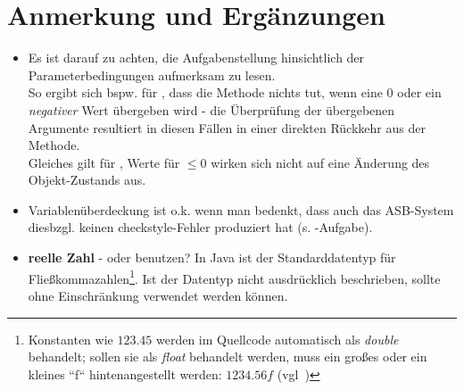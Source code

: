 \section{Anmerkung und Ergänzungen}

\begin{itemize}
    \item Es ist darauf zu achten, die Aufgabenstellung hinsichtlich der Parameterbedingungen aufmerksam zu lesen.\\
    So ergibt sich bspw. für , dass die Methode nichts tut, wenn eine $0$ oder ein \textit{negativer} Wert übergeben wird - die Überprüfung der übergebenen Argumente resultiert in diesen Fällen in einer direkten Rückkehr aus der Methode.\\
    Gleiches gilt für , Werte für  $\leq 0$ wirken sich nicht auf eine Änderung des Objekt-Zustands aus.
    \item Variablenüberdeckung ist o.k. wenn man bedenkt, dass auch das ASB-System diesbzgl. keinen checkstyle-Fehler produziert hat (s. -Aufgabe).
    \item \textbf{reelle Zahl} -  oder  benutzen?
    In Java ist  der Standarddatentyp für Fließkommazahlen\footnote{Konstanten wie $123.45$ werden im Quellcode automatisch als \textit{double} behandelt; sollen sie als \textit{float} behandelt werden, muss ein großes oder ein kleines ``f`` hintenangestellt werden: $1234.56f$ (vgl~\cite[124 f.]{Ull23})}.
    Ist der Datentyp nicht ausdrücklich beschrieben, sollte  ohne Einschränkung verwendet werden können.
\end{itemize}
